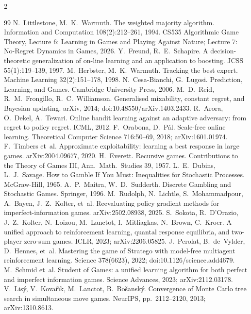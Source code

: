 \documentclass[10pt]{article}
\theoremstyle{plain}
\theoremstyle{definition}
\theoremstyle{remark}
\begin{document}
\begin{multicols}{2}
\begin{thebibliography}{99}
 N.~Littlestone, M.~K.~Warmuth. The weighted majority algorithm. Information and Computation 108(2):212--261, 1994.
 CS535 Algorithmic Game Theory, Lecture 6: Learning in Games and Playing Against Nature; Lecture 7: No-Regret Dynamics in Games, 2026.
 Y.~Freund, R.~E.~Schapire. A decision-theoretic generalization of on-line learning and an application to boosting. JCSS 55(1):119--139, 1997.
 M.~Herbster, M.~K.~Warmuth. Tracking the best expert. Machine Learning 32(2):151--178, 1998.
 N.~Cesa-Bianchi, G.~Lugosi. Prediction, Learning, and Games. Cambridge University Press, 2006.
 M.~D.~Reid, R.~M.~Frongillo, R.~C.~Williamson. Generalised mixability, constant regret, and Bayesian updating. arXiv, 2014; doi:10.48550/arXiv.1403.2433.
 R.~Arora, O.~Dekel, A.~Tewari. Online bandit learning against an adaptive adversary: from regret to policy regret. ICML, 2012.
 F.~Orabona, D.~P\'al. Scale-free online learning. Theoretical Computer Science 716:50--69, 2018; arXiv:1601.01974.
 F.~Timbers et~al. Approximate exploitability: learning a best response in large games. arXiv:2004.09677, 2020.
 H.~Everett. Recursive games. Contributions to the Theory of Games III, Ann.\ Math.\ Studies 39, 1957.
 L.~E.~Dubins, L.~J.~Savage. How to Gamble If You Must: Inequalities for Stochastic Processes. McGraw-Hill, 1965.
 A.~P.~Maitra, W.~D.~Sudderth. Discrete Gambling and Stochastic Games. Springer, 1996.
 M.~Rudolph, N.~Lichtle, S.~Mohammadpour, A.~Bayen, J.~Z.~Kolter, et~al. Reevaluating policy gradient methods for imperfect-information games. arXiv:2502.08938, 2025.
 S.~Sokota, R.~D'Orazio, J.~Z.~Kolter, N.~Loizou, M.~Lanctot, I.~Mitliagkas, N.~Brown, C.~Kroer. A unified approach to reinforcement learning, quantal response equilibria, and two-player zero-sum games. ICLR, 2023; arXiv:2206.05825. %
 J.~Perolat, B.~de~Vylder, D.~Hennes, et~al. Mastering the game of Stratego with model-free multiagent reinforcement learning. Science 378(6623), 2022; doi:10.1126/science.add4679.
 M.~Schmid et~al. Student of Games: a unified learning algorithm for both perfect and imperfect information games. Science Advances, 2023; arXiv:2112.03178. %
 V.~Lis\'y, V.~Kova\v{r}\'{\i}k, M.~Lanctot, B.~Bo\v{s}ansk\'y. Convergence of Monte Carlo tree search in simultaneous move games. NeurIPS, pp.~2112--2120, 2013; arXiv:1310.8613.

\end{thebibliography}
\end{multicols}
\end{document}

